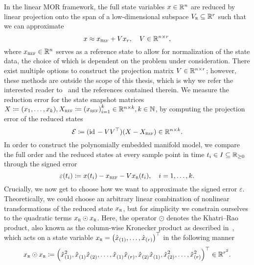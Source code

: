 In the linear MOR framework, the full state variables $x \in \mathbb{R}^n$ are reduced by linear projection onto the span of a low-dimensional subspace $V_{\textnormal{\scshape r}} \subseteq \mathbb{R}^r$ such that we can approximate
\begin{equation}\label{eq:linear-state-reduction}
    x \approx x_{\textnormal{\scshape ref}} + V x_r,\quad V \in \mathbb{R}^{n \times r},
\end{equation}
where $x_{\textnormal{\scshape ref}} \in \mathbb{R}^n$ serves as a reference state to allow for normalization of the state data, the choice of which is dependent on the problem under consideration.
There exist multiple options to construct the projection matrix $V \in \mathbb{R}^{n \times r}$; however, these methods are outside the scope of this thesis, which is why we refer the interested reader to~\cite{BOP2017, BCO2017} and the references contained therein.
We measure the reduction error for the state snapshot matrices $X \coloneqq (x_1, \dots, x_k), X_{\textnormal{\scshape ref}} \coloneqq {(x_{\textnormal{\scshape ref}})}_{i = 1}^k \in \mathbb{R}^{n \times k},k \in \mathbb{N}$, by computing the projection error of the reduced states
\begin{equation}
    \mathcal{E} \coloneqq (\text{id}_{\mkern2mu } - V V^{\top}) (X - X_{\textnormal{\scshape ref}}) \in \mathbb{R}^{n \times k}.
\end{equation}
In order to construct the polynomially embedded manifold model, we compare the full order and the reduced states at every sample point in time $t_i \in I \subseteq \mathbb{R}_{\geq 0}$ through the signed error
\begin{equation}\label{eq:linear-signed-error}
    \varepsilon(t_i) \coloneqq x(t_i) - x_{\textnormal{\scshape ref}} - V x_{\textnormal{\scshape r}}(t_i),\quad i = 1, \dots, k.
\end{equation}
Crucially, we now get to choose how we want to approximate the signed error $\varepsilon$.
Theoretically, we could choose an arbitrary linear combination of nonlinear transformations of the reduced state $x_{\textnormal{\scshape r}}$, but for simplicity we constrain ourselves to the quadratic terms $x_{\textnormal{\scshape r}} \odot x_{\textnormal{\scshape r}}$.
Here, the operator $\odot$ denotes the Khatri--Rao product, also known as the column-wise Kronecker product as described in~\cite{Slyusar1999, Shuangzhe2008, Favier2021}, which acts on a state variable $x_{\textnormal{\scshape r}} = {\left( \hat{x}_{(1)}, \dots, \hat{x}_{(r)} \right)}^{\top}$ in the following manner
\begin{equation}\label{eq:redundant-khatri-rao}
    x_{\textnormal{\scshape r}} \odot x_{\textnormal{\scshape r}} \coloneqq {\left( \hat{x}_{(1)}^2, \hat{x}_{(1)}^{\phantom{1}} \hat{x}_{(2)}^{\phantom{1}}, \dots, \hat{x}_{(1)}^{\phantom{1}} \hat{x}_{(r)}^{\phantom{1}}, \hat{x}_{(2)}^{\phantom{1}} \hat{x}_{(1)}^{\phantom{1}}, \hat{x}_{(2)}^2, \dots, \hat{x}_{(r)}^2 \right)}^{\top} \in \mathbb{R}^{r^2}.
\end{equation}
